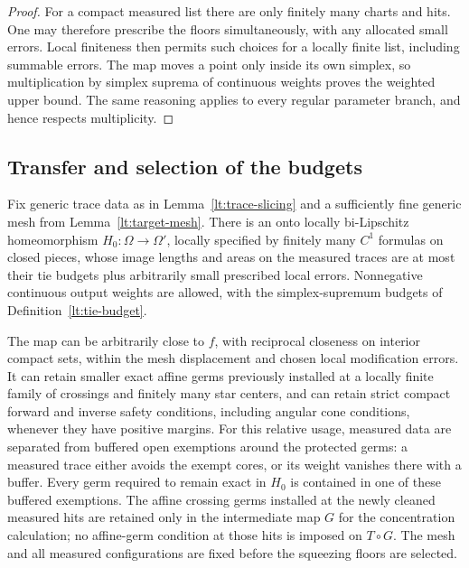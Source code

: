\begin{proof}
For a compact measured list there are only finitely many charts and
hits.  One may therefore prescribe the floors simultaneously, with
any allocated small errors.  Local finiteness then permits such
choices for a locally finite list, including summable errors.  The
map moves a point only inside its own simplex, so multiplication by
simplex suprema of continuous weights proves the weighted upper
bound.  The same reasoning applies to every regular parameter
branch, and hence respects multiplicity.
\end{proof}

\subsection{Transfer and selection of the budgets}

\begin{proposition}
\label{lt:budget-transfer}
Fix generic trace data as in Lemma~\ref{lt:trace-slicing} and a
sufficiently fine generic mesh from Lemma~\ref{lt:target-mesh}.
There is an onto locally bi-Lipschitz homeomorphism
$H_0:\Omega\to\Omega'$, locally specified by finitely many
$C^1$ formulas on closed pieces, whose image lengths and areas on
the measured traces are at most their tie budgets plus arbitrarily
small prescribed local errors.  Nonnegative continuous output
weights are allowed, with the simplex-supremum budgets of
Definition~\ref{lt:tie-budget}.

The map can be arbitrarily close to $f$, with reciprocal closeness
on interior compact sets, within the mesh displacement and chosen
local modification errors.  It can retain smaller exact affine
germs previously installed at a locally finite family of crossings
and finitely many star centers, and can retain strict compact
forward and inverse safety conditions, including angular cone
conditions, whenever they have positive margins.  For this relative
usage, measured data are separated from buffered open exemptions
around the protected germs: a measured trace either avoids the
exempt cores, or its weight vanishes there with a buffer.  Every
germ required to remain exact in $H_0$ is contained in one of these
buffered exemptions.  The affine crossing germs installed at the
newly cleaned measured hits are retained only in the intermediate
map $G$ for the concentration calculation; no affine-germ condition
at those hits is imposed on $T\circ G$.  The mesh and all measured
configurations are fixed before the squeezing floors are selected.
\end{proposition}

